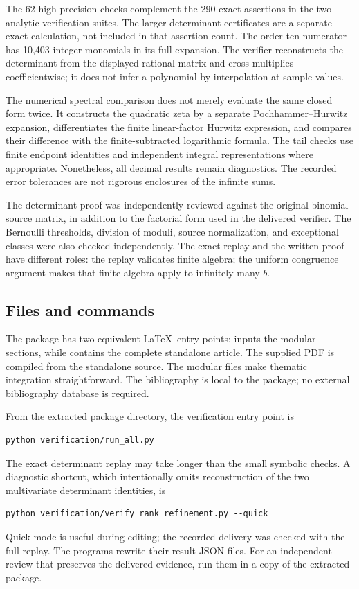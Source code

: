 The 62 high-precision checks complement the 290 exact assertions in
the two analytic verification suites. The larger determinant
certificates are a separate exact calculation, not included in that
assertion count. The order-ten numerator has 10,403 integer monomials
in its full expansion. The verifier reconstructs the determinant from
the displayed rational matrix and cross-multiplies coefficientwise;
it does not infer a polynomial by interpolation at sample values.

The numerical spectral comparison does not merely evaluate the same
closed form twice. It constructs the quadratic zeta by a separate
Pochhammer--Hurwitz expansion, differentiates the finite linear-factor
Hurwitz expression, and compares their difference with the
finite-subtracted logarithmic formula. The tail checks use finite
endpoint identities and independent integral representations where
appropriate. Nonetheless, all decimal results remain diagnostics.
The recorded error tolerances are not rigorous enclosures of the
infinite sums.

The determinant proof was independently reviewed against the original
binomial source matrix, in addition to the factorial form used in the
delivered verifier. The Bernoulli thresholds, division of moduli,
source normalization, and exceptional classes were also checked
independently. The exact replay and the written proof have different
roles: the replay validates finite algebra; the uniform congruence
argument makes that finite algebra apply to infinitely many $b$.

\subsection{Files and commands}

The package has two equivalent \LaTeX\ entry points:
 inputs the modular sections, while
 contains the complete
standalone article. The supplied PDF is compiled from the standalone
source. The modular files make thematic integration straightforward.
The bibliography is local to the package; no external bibliography
database is required.

From the extracted package directory, the verification entry point is
\begin{verbatim}
python verification/run_all.py
\end{verbatim}
The exact determinant replay may take longer than the small symbolic
checks. A diagnostic shortcut, which intentionally omits reconstruction
of the two multivariate determinant identities, is
\begin{verbatim}
python verification/verify_rank_refinement.py --quick
\end{verbatim}
Quick mode is useful during editing; the recorded delivery was checked
with the full replay. The programs rewrite their result JSON files.
For an independent review that preserves the delivered evidence,
run them in a copy of the extracted package.

